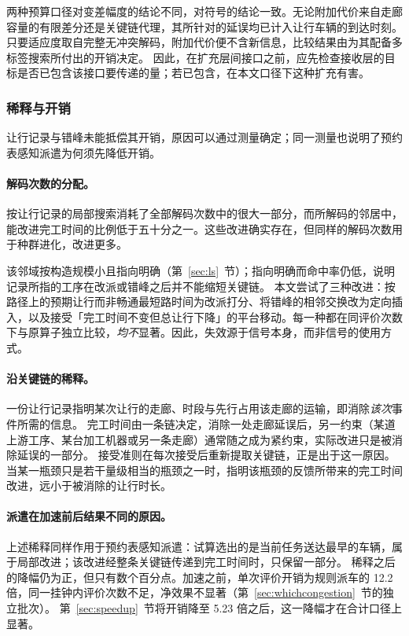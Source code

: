 \documentclass[manuscript,screen,review]{acmart}
\newcommand{\CostMultBefore}{12.2}
\newcommand{\CostMultAfter}{5.23}
\begin{document}
两种预算口径对变差幅度的结论不同，对符号的结论一致。无论附加代价来自走廊容量的有限差分还是关键链代理，其所针对的延误均已计入让行车辆的到达时刻。只要适应度取自完整无冲突解码，附加代价便不含新信息，比较结果由为其配备多标签搜索所付出的开销决定。
因此，在扩充层间接口之前，应先检查接收层的目标是否已包含该接口要传递的量；若已包含，在本文口径下这种扩充有害。

\subsubsection{稀释与开销}
\label{sec:whycost}

让行记录与错峰未能抵偿其开销，原因可以通过测量确定；同一测量也说明了预约表感知派遣为何须先降低开销。

\paragraph{解码次数的分配。}
按让行记录的局部搜索消耗了全部解码次数中的很大一部分，而所解码的邻居中，能改进完工时间的比例低于五十分之一。这些改进确实存在，但同样的解码次数用于种群进化，改进更多。

该邻域按构造规模小且指向明确（第~\ref{sec:ls}~节）；指向明确而命中率仍低，说明记录所指的工序在改派或错峰之后并不能缩短关键链。
本文尝试了三种改进：按路径上的预期让行而非畅通最短路时间为改派打分、将错峰的相邻交换改为定向插入，以及接受「完工时间不变但总让行下降」的平台移动。每一种都在同评价次数下与原算子独立比较，\emph{均不}显著。因此，失效源于信号本身，而非信号的使用方式。

\paragraph{沿关键链的稀释。}
一份让行记录指明某次让行的走廊、时段与先行占用该走廊的运输，即消除\emph{该次}事件所需的信息。
完工时间由一条链决定，消除一处走廊延误后，另一约束（某道上游工序、某台加工机器或另一条走廊）通常随之成为紧约束，实际改进只是被消除延误的一部分。
接受准则在每次接受后重新提取关键链，正是出于这一原因。当某一瓶颈只是若干量级相当的瓶颈之一时，指明该瓶颈的反馈所带来的完工时间改进，远小于被消除的让行时长。

\paragraph{派遣在加速前后结果不同的原因。}
上述稀释同样作用于预约表感知派遣：试算选出的是当前任务送达最早的车辆，属于局部改进；该改进经整条关键链传递到完工时间时，只保留一部分。
稀释之后的降幅仍为正，但只有数个百分点。加速之前，单次评价开销为规则派车的 \CostMultBefore{} 倍，同一挂钟内评价次数不足，净效果不显著（第~\ref{sec:whichcongestion}~节的独立批次）。
第~\ref{sec:speedup}~节将开销降至 \CostMultAfter{} 倍之后，这一降幅才在合计口径上显著。
\end{document}
